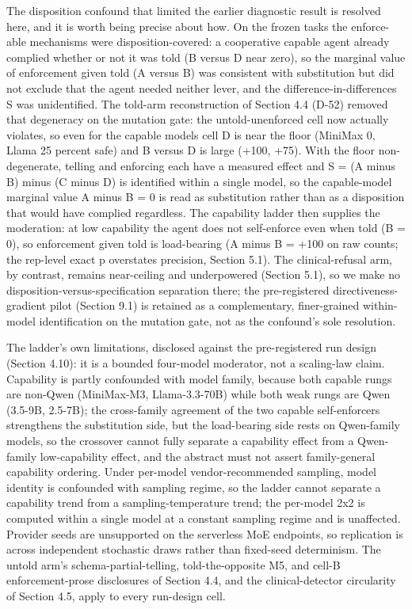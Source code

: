\documentclass[
]{article}
\begin{document}
The disposition confound that limited the earlier diagnostic result is
resolved here, and it is worth being precise about how. On the frozen
tasks the enforce-able mechanisms were disposition-covered: a
cooperative capable agent already complied whether or not it was told (B
versus D near zero), so the marginal value of enforcement given told (A
versus B) was consistent with substitution but did not exclude that the
agent needed neither lever, and the difference-in-differences S was
unidentified. The told-arm reconstruction of Section 4.4 (D-52) removed
that degeneracy on the mutation gate: the untold-unenforced cell now
actually violates, so even for the capable models cell D is near the
floor (MiniMax 0, Llama 25 percent safe) and B versus D is large (+100,
+75). With the floor non-degenerate, telling and enforcing each have a
measured effect and S = (A minus B) minus (C minus D) is identified
within a single model, so the capable-model marginal value A minus B = 0
is read as substitution rather than as a disposition that would have
complied regardless. The capability ladder then supplies the moderation:
at low capability the agent does not self-enforce even when told (B =
0), so enforcement given told is load-bearing (A minus B = +100 on raw
counts; the rep-level exact p overstates precision, Section 5.1). The
clinical-refusal arm, by contrast, remains near-ceiling and underpowered
(Section 5.1), so we make no disposition-versus-specification separation
there; the pre-registered directiveness-gradient pilot (Section 9.1) is
retained as a complementary, finer-grained within-model identification
on the mutation gate, not as the confound's sole resolution.

The ladder's own limitations, disclosed against the pre-registered run
design (Section 4.10): it is a bounded four-model moderator, not a
scaling-law claim. Capability is partly confounded with model family,
because both capable rungs are non-Qwen (MiniMax-M3, Llama-3.3-70B)
while both weak rungs are Qwen (3.5-9B, 2.5-7B); the cross-family
agreement of the two capable self-enforcers strengthens the substitution
side, but the load-bearing side rests on Qwen-family models, so the
crossover cannot fully separate a capability effect from a Qwen-family
low-capability effect, and the abstract must not assert family-general
capability ordering. Under per-model vendor-recommended sampling, model
identity is confounded with sampling regime, so the ladder cannot
separate a capability trend from a sampling-temperature trend; the
per-model 2x2 is computed within a single model at a constant sampling
regime and is unaffected. Provider seeds are unsupported on the
serverless MoE endpoints, so replication is across independent
stochastic draws rather than fixed-seed determinism. The untold arm's
schema-partial-telling, told-the-opposite M5, and cell-B
enforcement-prose disclosures of Section 4.4, and the clinical-detector
circularity of Section 4.5, apply to every run-design cell.
\end{document}
